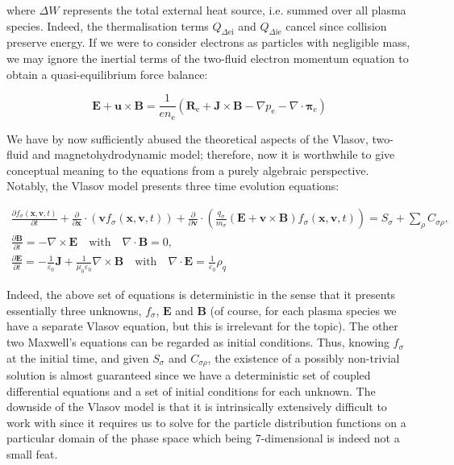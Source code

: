 where $\Delta W$ represents the total external heat source, i.e. summed over all plasma species. Indeed, the thermalisation terms $Q_{\Delta{\mathrm{ei}}}$ and $Q_{\Delta{\mathrm{ie}}}$ cancel since collision preserve energy. If we were to consider electrons as particles with negligible mass, we may ignore the inertial terms of the two-fluid electron momentum equation to obtain a quasi-equilibrium force balance:

\begin{equation}
    \mathbf{E}+\mathbf{u}\times \mathbf{B} = \frac{1}{en_{\mathrm{e}}}\left(\mathbf{R}_{\mathrm{e}}+\mathbf{J}\times \mathbf{B}-\nabla p_{\mathrm{e}}-\nabla\cdot \boldsymbol{\pi}_{\mathrm{e}}\right)
\end{equation}

We have by now sufficiently abused the theoretical aspects of the Vlasov, two-fluid and magnetohydrodynamic model; therefore, now it is worthwhile to give conceptual meaning to the equations from a purely algebraic perspective. Notably, the Vlasov model presents three time evolution equations:

\begin{gather}
    \frac{\partial f_\sigma(\mathbf{x},\mathbf{v},t)}{\partial t}+\frac{\partial}{\partial \mathbf{x}}\cdot \left(\mathbf{v}f_\sigma(\mathbf{x},\mathbf{v},t)\right)+\frac{\partial}{\partial \mathbf{v}}\cdot \left(\frac{q_\sigma}{m_\sigma}\left(\mathbf{E}+\mathbf{v}\times \mathbf{B}\right)f_\sigma(\mathbf{x},\mathbf{v},t)\right)=S_\sigma+\sum_{\rho}C_{\sigma\rho},\\
    \frac{\partial \mathbf{B}}{\partial t}=-\nabla\times \mathbf{E}\quad\text{with}\quad \nabla\cdot \mathbf{B}=0,\\
    \frac{\partial \mathbf{E}}{\partial t}=-\frac{1}{\varepsilon_0}\mathbf{J}+\frac{1}{\mu_0 \varepsilon_0}\nabla\times \mathbf{B}\quad\text{with}\quad \nabla\cdot \mathbf{E}=\frac{1}{\varepsilon_0}\rho_q
\end{gather}

Indeed, the above set of equations is deterministic in the sense that it presents essentially three unknowns, $f_{\sigma}$, $\mathbf{E}$ and $\mathbf{B}$ (of course, for each plasma species we have a separate Vlasov equation, but this is irrelevant for the topic). The other two Maxwell's equations can be regarded as initial conditions. Thus, knowing $f_\sigma$ at the initial time, and given $S_\sigma$ and $C_{\sigma\rho}$, the existence of a possibly non-trivial solution is almost guaranteed since we have a deterministic set of coupled differential equations and a set of initial conditions for each unknown. The downside of the Vlasov model is that it is intrinsically extensively difficult to work with since it requires us to solve for the particle distribution functions on a particular domain of the phase space which being 7-dimensional is indeed not a small feat.  

